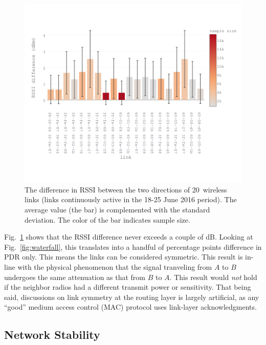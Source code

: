\documentclass{sig-alternate}
\begin{document}
\begin{figure}
    \centering
    \includegraphics[width=\columnwidth]{sym_plot}
    \caption{
        The difference in RSSI between the two directions of 20~wireless links
        (links continuously active in the 18-25 June 2016 period).
        The average value (the bar) is complemented with the standard deviation.
        The color of the bar indicates sample size.
    }
    \label{fig:tab_symmetry}
\end{figure}


Fig.~\ref{fig:tab_symmetry} shows that the RSSI difference never exceeds a couple of dB.
Looking at Fig.~\ref{fig:waterfall}, this translates into a handful of percentage points difference in PDR only.
This means the links can be considered symmetric.
This result is in-line with the physical phenomenon that the signal tranveling from $A$ to $B$ undergoes the same attenuation as that from $B$ to $A$.
This result would \textit{not} hold if the neighbor radios had a different transmit power or sensitivity.
That being said, discussions on link symmetry at the routing layer is largely artificial, as any ``good'' medium access control (MAC) protocol uses link-layer acknowledgments.

\subsection{Network Stability}
\label{sec:net_stability}
\end{document}
